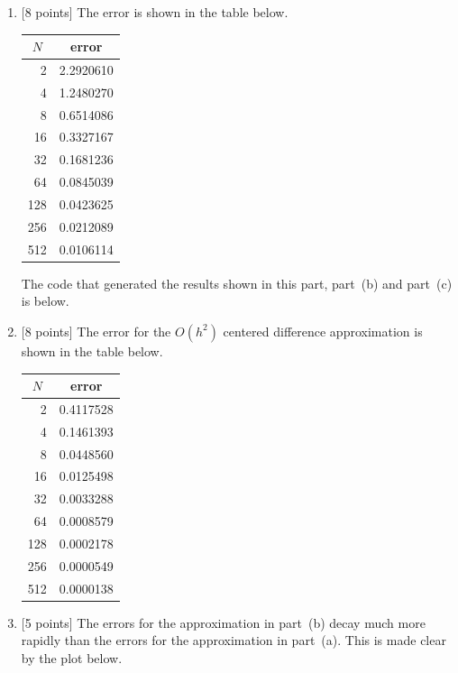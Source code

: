 \begin{solution}
\begin{enumerate}
\item {[8 points]} The error is shown in the table below.
\begin{center}
\begin{tabular}{r|r}
\hline
\multicolumn{1}{c|}{$N$} & \multicolumn{1}{c}{error} \\ 
\hline
   2  &  2.2920610 \\
   4  &  1.2480270 \\
   8  &  0.6514086 \\
  16  &  0.3327167 \\
  32  &  0.1681236 \\
  64  &  0.0845039 \\
 128  &  0.0423625 \\
 256  &  0.0212089 \\
 512  &  0.0106114
\end{tabular}\end{center} 

The code that generated the results shown in this part, part~(b) and part~(c) is below.



\item {[8 points]} 
The error for the $O(h^2)$ centered difference approximation is shown in the table below.
\begin{center}
\begin{tabular}{r|r}
\hline
\multicolumn{1}{c|}{$N$} & \multicolumn{1}{c}{error} \\
\hline
   2 &  0.4117528 \\
   4 &  0.1461393 \\
   8 &  0.0448560 \\
  16 &  0.0125498 \\
  32 &  0.0033288 \\
  64 &  0.0008579 \\
 128 &  0.0002178 \\
 256 &  0.0000549 \\
 512 &  0.0000138
\end{tabular}\end{center}

\item {[5 points]} The errors for the approximation in part~(b) decay much more rapidly than the errors for the approximation in part~(a). This is made clear by the plot below.


\end{enumerate}
\end{solution}
